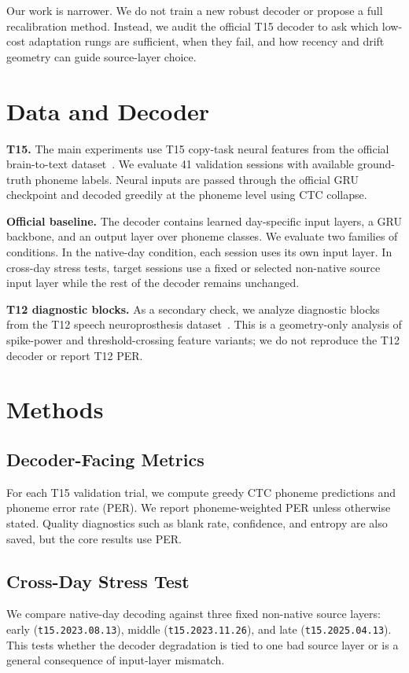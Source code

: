 \documentclass[10pt]{article}
\begin{document}
Our work is narrower. We do not train a new robust decoder or propose a full
recalibration method. Instead, we audit the official T15 decoder to ask which
low-cost adaptation rungs are sufficient, when they fail, and how recency and
drift geometry can guide source-layer choice.

\section{Data and Decoder}
\textbf{T15.} The main experiments use T15 copy-task neural features from the
official brain-to-text dataset~\cite{card2024accurate}. We evaluate 41
validation sessions with available ground-truth phoneme labels. Neural inputs
are passed through the official GRU checkpoint and decoded greedily at the
phoneme level using CTC collapse.

\textbf{Official baseline.} The decoder contains learned day-specific input
layers, a GRU backbone, and an output layer over phoneme classes. We evaluate two
families of conditions. In the native-day condition, each session uses its own
input layer. In cross-day stress tests, target sessions use a fixed or selected
non-native source input layer while the rest of the decoder remains unchanged.

\textbf{T12 diagnostic blocks.} As a secondary check, we analyze diagnostic
blocks from the T12 speech neuroprosthesis dataset~\cite{willett2023speech}.
This is a geometry-only analysis of spike-power and threshold-crossing feature
variants; we do not reproduce the T12 decoder or report T12 PER.

\section{Methods}
\subsection{Decoder-Facing Metrics}
For each T15 validation trial, we compute greedy CTC phoneme predictions and
phoneme error rate (PER). We report phoneme-weighted PER unless otherwise stated.
Quality diagnostics such as blank rate, confidence, and entropy are also saved,
but the core results use PER.

\subsection{Cross-Day Stress Test}
We compare native-day decoding against three fixed non-native source layers:
early (\texttt{t15.2023.08.13}), middle (\texttt{t15.2023.11.26}), and late
(\texttt{t15.2025.04.13}). This tests whether the decoder degradation is tied to
one bad source layer or is a general consequence of input-layer mismatch.
\end{document}
